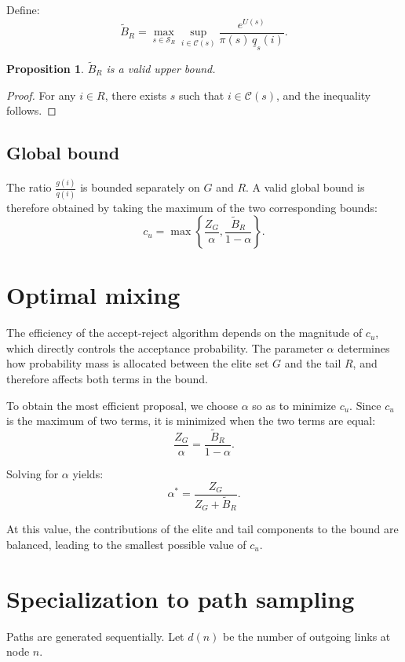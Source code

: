 \documentclass[11pt]{article}
\newtheorem{proposition}{Proposition}
\begin{document}
Define:
\[
\widetilde{B}_R =
\max_{s \in \mathcal{S}_R}
\sup_{i \in \mathcal{C}(s)}
\frac{e^{U(s)}}{\pi(s)\,\underline{q}_s(i)}.
\]

\begin{proposition}
$\widetilde{B}_R$ is a valid upper bound.
\end{proposition}

\begin{proof}
For any $i \in R$, there exists $s$ such that $i \in \mathcal{C}(s)$, and the inequality follows.
\end{proof}

\subsection{Global bound}
The ratio $\frac{g(i)}{q(i)}$ is bounded separately on $G$ and $R$. A valid global bound is therefore obtained by taking the maximum of the two corresponding bounds:
\[
c_u =
\max \left\{
\frac{Z_G}{\alpha},
\frac{\widetilde{B}_R}{1-\alpha}
\right\}.
\]

\section{Optimal mixing}

The efficiency of the accept-reject algorithm depends on the magnitude of $c_u$, which directly controls the acceptance probability. The parameter $\alpha$ determines how probability mass is allocated between the elite set $G$ and the tail $R$, and therefore affects both terms in the bound.

To obtain the most efficient proposal, we choose $\alpha$ so as to minimize $c_u$. Since $c_u$ is the maximum of two terms, it is minimized when the two terms are equal:
\[
\frac{Z_G}{\alpha} = \frac{\widetilde{B}_R}{1-\alpha}.
\]

Solving for $\alpha$ yields:
\[
\alpha^* = \frac{Z_G}{Z_G + \widetilde{B}_R}.
\]

At this value, the contributions of the elite and tail components to the bound are balanced, leading to the smallest possible value of $c_u$.

\section{Specialization to path sampling}

Paths are generated sequentially. Let $d(n)$ be the number of outgoing links at node $n$.
\end{document}
